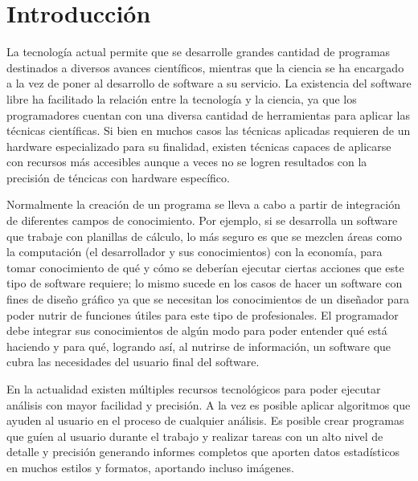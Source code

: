 \chapter{Introducci\'on}
La tecnolog\'ia actual permite que se desarrolle grandes cantidad de programas destinados a diversos avances cient\'ificos, mientras que la ciencia se ha encargado a la vez de poner al desarrollo de software a su servicio. La existencia del software libre ha facilitado la relaci\'on entre la tecnolog\'ia y la ciencia, ya que los programadores cuentan con una diversa cantidad de herramientas para aplicar las t\'ecnicas cient\'ificas. Si bien en muchos casos las t\'ecnicas aplicadas requieren de un hardware especializado para su finalidad, existen t\'ecnicas capaces de aplicarse con recursos m\'as accesibles aunque a veces no se logren resultados con la precisi\'on de t\'encicas con hardware espec\'ifico.

Normalmente la creaci\'on de un programa se lleva a cabo a partir de integraci\'on de diferentes campos de conocimiento. Por ejemplo, si se desarrolla un software que trabaje con planillas de c\'alculo, lo m\'as seguro es que se mezclen \'areas como la computaci\'on (el desarrollador y sus conocimientos) con la econom\'ia, para tomar conocimiento de qu\'e y c\'omo se deber\'ian ejecutar ciertas acciones que este tipo de software requiere; lo mismo sucede en los casos de hacer un software con fines de dise\~no gr\'afico ya que se necesitan los conocimientos de un dise\~nador para poder nutrir de funciones \'utiles para este tipo de profesionales. El programador debe integrar sus conocimientos de alg\'un modo para poder entender qu\'e est\'a haciendo y para qu\'e, logrando as\'i, al nutrirse de informaci\'on, un software que cubra las necesidades del usuario final del software.

En la actualidad existen m\'ultiples recursos tecnol\'ogicos para poder ejecutar an\'alisis con mayor facilidad y precisi\'on. A la vez es posible aplicar algoritmos que ayuden al usuario en el proceso de cualquier an\'alisis. Es posible crear programas que gu\'ien al usuario durante el trabajo y realizar tareas con un alto nivel de detalle y precisi\'on generando informes completos que aporten datos estad\'isticos en muchos estilos y formatos, aportando incluso im\'agenes.

